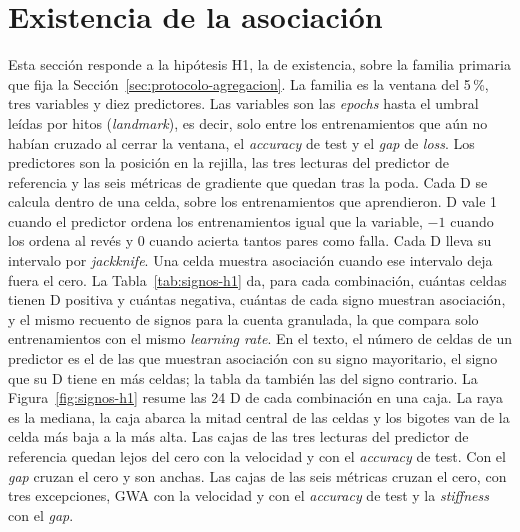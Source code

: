 \section{Existencia de la asociación}
\label{sec:res-por-condicion}

Esta sección responde a la hipótesis H1, la de existencia, sobre la familia primaria que fija la Sección~\ref{sec:protocolo-agregacion}. La familia es la ventana del 5\,\%, tres variables y diez predictores. Las variables son las \emph{epochs} hasta el umbral leídas por hitos (\emph{landmark}), es decir, solo entre los entrenamientos que aún no habían cruzado al cerrar la ventana, el \emph{accuracy} de test y el \emph{gap} de \emph{loss}. Los predictores son la posición en la rejilla, las tres lecturas del predictor de referencia y las seis métricas de gradiente que quedan tras la poda. Cada D se calcula dentro de una celda, sobre los entrenamientos que aprendieron. D vale 1 cuando el predictor ordena los entrenamientos igual que la variable, $-1$ cuando los ordena al revés y 0 cuando acierta tantos pares como falla. Cada D lleva su intervalo por \emph{jackknife}. Una celda muestra asociación cuando ese intervalo deja fuera el cero. La Tabla~\ref{tab:signos-h1} da, para cada combinación, cuántas celdas tienen D positiva y cuántas negativa, cuántas de cada signo muestran asociación, y el mismo recuento de signos para la cuenta granulada, la que compara solo entrenamientos con el mismo \emph{learning rate}. En el texto, el número de celdas de un predictor es el de las que muestran asociación con su signo mayoritario, el signo que su D tiene en más celdas; la tabla da también las del signo contrario. La Figura~\ref{fig:signos-h1} resume las 24 D de cada combinación en una caja. La raya es la mediana, la caja abarca la mitad central de las celdas y los bigotes van de la celda más baja a la más alta. Las cajas de las tres lecturas del predictor de referencia quedan lejos del cero con la velocidad y con el \emph{accuracy} de test. Con el \emph{gap} cruzan el cero y son anchas. Las cajas de las seis métricas cruzan el cero, con tres excepciones, GWA con la velocidad y con el \emph{accuracy} de test y la \emph{stiffness} con el \emph{gap}.

